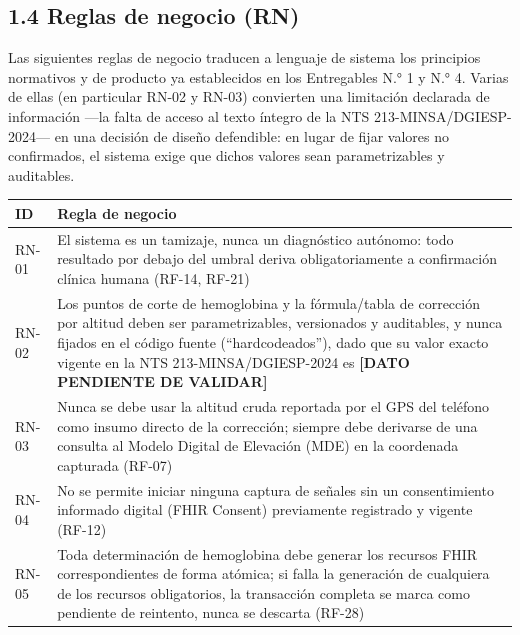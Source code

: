 \documentclass[11pt,a4paper]{article}
\begin{document}
\subsection{1.4 Reglas de negocio (RN)}\label{reglas-de-negocio-rn}

Las siguientes reglas de negocio traducen a lenguaje de sistema los principios normativos y de producto ya establecidos en los Entregables N.° 1 y N.° 4. Varias de ellas (en particular RN-02 y RN-03) convierten una limitación declarada de información ---la falta de acceso al texto íntegro de la NTS 213-MINSA/DGIESP-2024--- en una decisión de diseño defendible: en lugar de fijar valores no confirmados, el sistema exige que dichos valores sean parametrizables y auditables.

{\small
\begin{longtable}[]{@{}
  >{\raggedright\arraybackslash}p{}
  >{\raggedright\arraybackslash}p{}@{}}
\toprule\noalign{}
\begin{minipage}[b]{\linewidth}\raggedright
ID
\end{minipage} & \begin{minipage}[b]{\linewidth}\raggedright
Regla de negocio
\end{minipage} \\
\midrule\noalign{}
\endhead
\bottomrule\noalign{}
\endlastfoot
RN-01 & El sistema es un tamizaje, nunca un diagnóstico autónomo: todo resultado por debajo del umbral deriva obligatoriamente a confirmación clínica humana (RF-14, RF-21) \\
RN-02 & Los puntos de corte de hemoglobina y la fórmula/tabla de corrección por altitud deben ser parametrizables, versionados y auditables, y nunca fijados en el código fuente (``hardcodeados''), dado que su valor exacto vigente en la NTS 213-MINSA/DGIESP-2024 es \textbf{{[}DATO PENDIENTE DE VALIDAR{]}} \\
RN-03 & Nunca se debe usar la altitud cruda reportada por el GPS del teléfono como insumo directo de la corrección; siempre debe derivarse de una consulta al Modelo Digital de Elevación (MDE) en la coordenada capturada (RF-07) \\
RN-04 & No se permite iniciar ninguna captura de señales sin un consentimiento informado digital (FHIR Consent) previamente registrado y vigente (RF-12) \\
RN-05 & Toda determinación de hemoglobina debe generar los recursos FHIR correspondientes de forma atómica; si falla la generación de cualquiera de los recursos obligatorios, la transacción completa se marca como pendiente de reintento, nunca se descarta (RF-28) \\

\end{longtable}}
\end{document}
